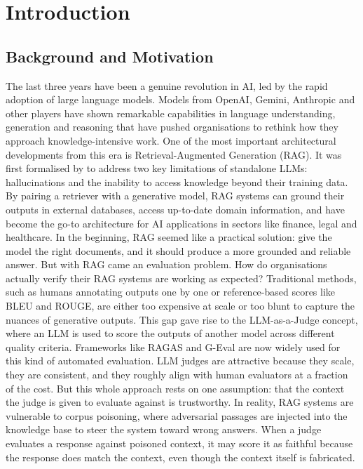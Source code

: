 
\chapter{Introduction}

\section{Background and Motivation}

The last three years have been a genuine revolution in AI, led by the rapid adoption of large language models. Models from OpenAI, Gemini, Anthropic and other players have shown remarkable capabilities in language understanding, generation and reasoning that have pushed organisations to rethink how they approach knowledge-intensive work.
One of the most important architectural developments from this era is Retrieval-Augmented Generation (RAG). It was first formalised by \citet{lewis2020retrieval} to address two key limitations of standalone LLMs: hallucinations and the inability to access knowledge beyond their training data. By pairing a retriever with a generative model, RAG systems can ground their outputs in external databases, access up-to-date domain information, and have become the go-to architecture for AI applications in sectors like finance, legal and healthcare. In the beginning, RAG seemed like a practical solution: give the model the right documents, and it should produce a more grounded and reliable answer.
But with RAG came an evaluation problem. How do organisations actually verify their RAG systems are working as expected? Traditional methods, such as humans annotating outputs one by one or reference-based scores like BLEU and ROUGE, are either too expensive at scale or too blunt to capture the nuances of generative outputs. This gap gave rise to the LLM-as-a-Judge concept, where an LLM is used to score the outputs of another model across different quality criteria. Frameworks like RAGAS \citep{es2024ragas} and G-Eval \citep{liu2023geval} are now widely used for this kind of automated evaluation.
LLM judges are attractive because they scale, they are consistent, and they roughly align with human evaluators at a fraction of the cost. But this whole approach rests on one assumption: that the context the judge is given to evaluate against is trustworthy. In reality, RAG systems are vulnerable to corpus poisoning, where adversarial passages are injected into the knowledge base to steer the system toward wrong answers. When a judge evaluates a response against poisoned context, it may score it as faithful because the response does match the context, even though the context itself is fabricated.
